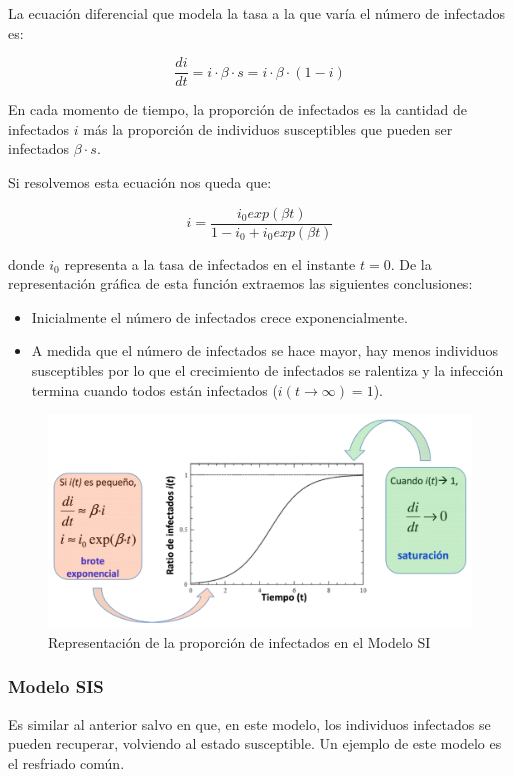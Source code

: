 \documentclass[]{article}
\begin{document}
La ecuación diferencial que modela la tasa a la que varía el número de
infectados es:

\[\frac{di}{dt} = i \cdot \beta  \cdot s = i \cdot \beta \cdot (1-i)\]

En cada momento de tiempo, la proporción de infectados es la cantidad de
infectados \(i\) más la proporción de individuos susceptibles que pueden
ser infectados \(\beta \cdot s\).

Si resolvemos esta ecuación nos queda que:

\[i = \frac{i_0exp(\beta t)}{1-i_0+i_0exp(\beta t)}\]

donde \(i_0\) representa a la tasa de infectados en el instante \(t=0\).
De la representación gráfica de esta función extraemos las siguientes
conclusiones:

\begin{itemize}
\itemsep1pt\parskip0pt
\item
  Inicialmente el número de infectados crece exponencialmente.
\item
  A medida que el número de infectados se hace mayor, hay menos
  individuos susceptibles por lo que el crecimiento de infectados se
  ralentiza y la infección termina cuando todos están infectados
  (\(i(t \to \infty)= 1\)).
\end{itemize}

\begin{figure}[htbp]
\centering
\includegraphics{../images/tema08/graficaSI.png}
\caption{Representación de la proporción de infectados en el Modelo SI}
\end{figure}

\subsubsection{Modelo SIS}\label{modelo-sis}

Es similar al anterior salvo en que, en este modelo, los individuos
infectados se pueden recuperar, volviendo al estado susceptible. Un
ejemplo de este modelo es el resfriado común.
\end{document}
